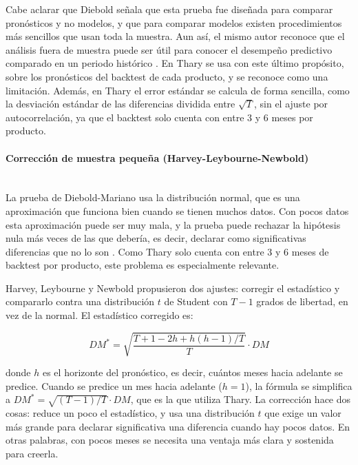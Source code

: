 Cabe aclarar que Diebold \cite{diebold2015comparing} señala que esta prueba fue diseñada para comparar pronósticos y no modelos, y que para comparar modelos existen procedimientos más sencillos que usan toda la muestra. Aun así, el mismo autor reconoce que el análisis fuera de muestra puede ser útil para conocer el desempeño predictivo comparado en un periodo histórico \cite{diebold2015comparing}. En Thary se usa con este último propósito, sobre los pronósticos del backtest de cada producto, y se reconoce como una limitación. Además, en Thary el error estándar se calcula de forma sencilla, como la desviación estándar de las diferencias dividida entre $\sqrt{T}$, sin el ajuste por autocorrelación, ya que el backtest solo cuenta con entre 3 y 6 meses por producto.

\paragraph{Corrección de muestra pequeña (Harvey-Leybourne-Newbold)}\mbox{}\\
La prueba de Diebold-Mariano usa la distribución normal, que es una aproximación que funciona bien cuando se tienen muchos datos. Con pocos datos esta aproximación puede ser muy mala, y la prueba puede rechazar la hipótesis nula más veces de las que debería, es decir, declarar como significativas diferencias que no lo son \cite{diebold_mariano, harvey1997testing}. Como Thary solo cuenta con entre 3 y 6 meses de backtest por producto, este problema es especialmente relevante.

Harvey, Leybourne y Newbold \cite{harvey1997testing} propusieron dos ajustes: corregir el estadístico y compararlo contra una distribución $t$ de Student con $T - 1$ grados de libertad, en vez de la normal. El estadístico corregido es:

\begin{equation}
DM^{*} = \sqrt{\frac{T + 1 - 2h + h(h-1)/T}{T}} \cdot DM
\end{equation}

donde $h$ es el horizonte del pronóstico, es decir, cuántos meses hacia adelante se predice. Cuando se predice un mes hacia adelante ($h = 1$), la fórmula se simplifica a $DM^{*} = \sqrt{(T-1)/T} \cdot DM$, que es la que utiliza Thary. La corrección hace dos cosas: reduce un poco el estadístico, y usa una distribución $t$ que exige un valor más grande para declarar significativa una diferencia cuando hay pocos datos. En otras palabras, con pocos meses se necesita una ventaja más clara y sostenida para creerla.

